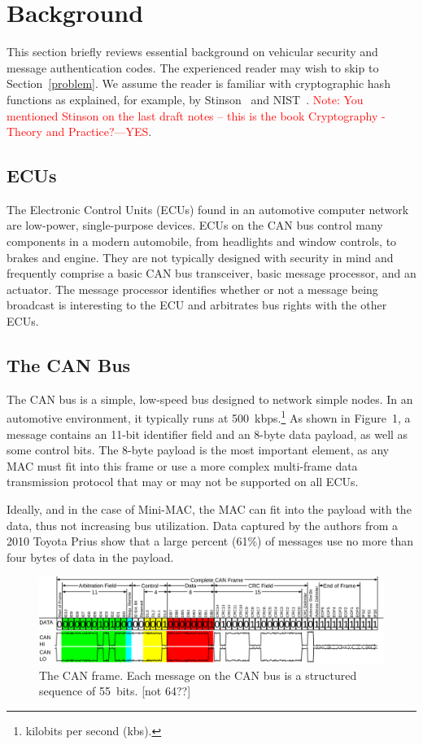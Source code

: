 \section{Background}
\label{background}

This section briefly reviews essential background on vehicular security and message authentication codes. 
The experienced reader may wish to skip to Section~\ref{problem}. 
We assume the reader is familiar with cryptographic hash functions as explained, for example, by Stinson~\cite{Sti} and NIST~\cite{FIPS-180-4}.
\textcolor{red}{Note: You mentioned Stinson on the last draft notes -- this is the book Cryptography - Theory and Practice?---YES}.

\subsection{ECUs}
The Electronic Control Units (ECUs) found in an automotive computer network are low-power, single-purpose devices. ECUs on the CAN bus control many components in a modern automobile, from headlights and window controls, to brakes and engine. They are not typically designed with security in mind and frequently comprise a basic CAN bus transceiver, basic message processor, and an actuator. The message processor identifies whether or not a message being broadcast is interesting to the ECU and arbitrates bus rights with the other ECUs. 

\subsection{The CAN Bus}
The CAN bus is a simple, low-speed bus designed to network simple nodes. In an automotive environment, 
it typically runs at 500~kbps.\footnote{kilobits per second (kbs).} As shown in Figure~1, a message contains an 11-bit identifier field and an 8-byte data payload, as well as some control bits. The 8-byte payload is the most important element, as any MAC must fit into this frame or use a more complex multi-frame data transmission protocol that may or may not be supported on all ECUs. 

Ideally, and in the case of Mini-MAC, the MAC can fit into the payload with the data, thus not increasing bus utilization. Data captured by the authors from a 2010 Toyota Prius show that a large percent (61\%) of messages use no more than four bytes of data in the payload.

	\begin{figure}
		\centering
		\includegraphics[width=\linewidth]{figures/can_frame.png}
		\caption{The CAN frame.  Each message on the CAN bus is a structured sequence of 55~bits. [not 64??]}
	\end{figure}

